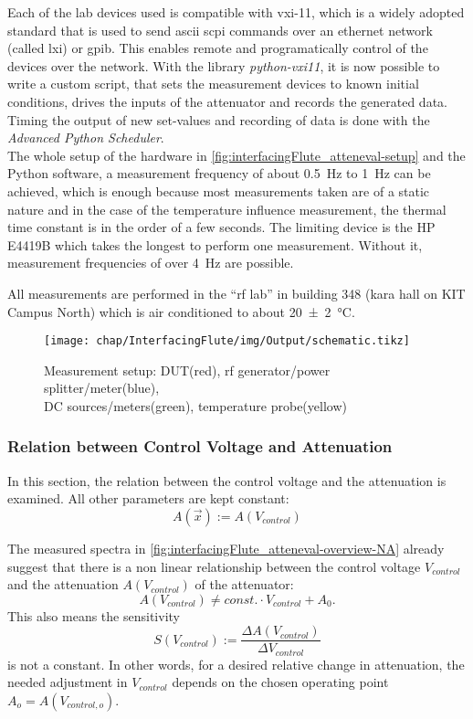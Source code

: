 Each of the lab devices used is compatible with \gls{vxi-11}, which is a widely adopted standard that is used to send \gls{ascii} \gls{scpi} commands over an ethernet network (called \gls{lxi}) or \gls{gpib}.\cite{lxi2021}
This enables remote and programatically control of the devices over the network.
With the library \textit{python-vxi11}, it is now possible to write a custom script, that sets the measurement devices to known initial conditions, drives the inputs of the attenuator and records the generated data. Timing the output of new set-values and recording of data is done with the \textit{Advanced Python Scheduler}.\cite{apscheduler}\\ 
The whole setup of the hardware in \autoref{fig:interfacingFlute_atteneval-setup} and the Python software, a measurement frequency of about \SI{0.5}{\Hz} to \SI{1}{\Hz} can be achieved, which is enough because most measurements taken are of a static nature and in the case of the temperature influence measurement, the thermal time constant is in the order of a few seconds.
The limiting device is the HP E4419B which takes the longest to perform one measurement. Without it, measurement frequencies of over \SI{4}{\Hz} are possible.

All measurements are performed in the ``\gls{rf} lab'' in building 348 (\gls{kara} hall on KIT Campus North) which is air conditioned to about \SI{20(2)}{\celsius}.

\begin{figure}[tb]
	\centering
	\texttt{[image: chap/InterfacingFlute/img/Output/schematic.tikz]}
	\caption{Measurement setup: DUT(red), \gls{rf} generator/power splitter/meter(blue),\\ DC sources/meters(green), temperature probe(yellow)}
	\label{fig:interfacingFlute_atteneval-setup}
\end{figure}

\subsubsection{Relation between Control Voltage and Attenuation}
In this section, the relation between the control voltage and the attenuation is examined. All other parameters are kept constant:
\begin{equation}
A(\vec{x}) := A(V_{control})
\end{equation}

The measured spectra in \autoref{fig:interfacingFlute_atteneval-overview-NA} already suggest that there is a non linear relationship between the control voltage $V_{control}$ and the attenuation $A(V_{control})$ of the attenuator:
\begin{equation}
A(V_{control}) \neq const. \cdot V_{control} + A_0.
\end{equation}
This also means the sensitivity
\begin{equation}
S(V_{control}) := \frac{\Delta A(V_{control})}{\Delta V_{control}}
\end{equation}
is not a constant.
In other words, for a desired relative change in attenuation, the needed adjustment in $V_{control}$ depends on the chosen operating point $A_o=A(V_{control,o})$.

